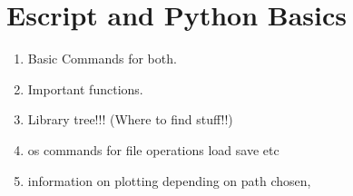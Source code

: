 
%
%
%

\section{Escript and Python Basics}

\begin{enumerate}
 \item Basic Commands for both.
 \item Important functions.
 \item Library tree!!! (Where to find stuff!!)
 \item os commands for file operations load save etc
 \item information on plotting depending on path chosen,
\end{enumerate}


